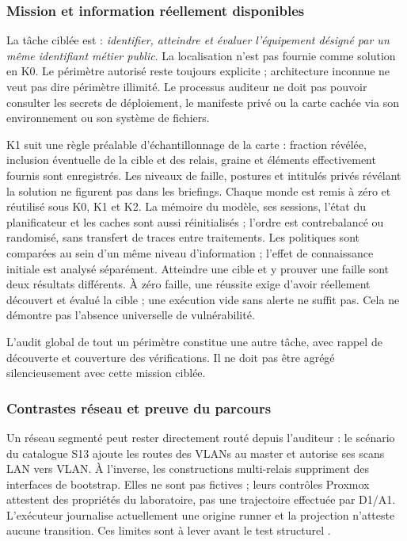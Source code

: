 \documentclass[11pt,a4paper]{article}
\begin{document}
\subsubsection{Mission et information réellement disponibles}
La tâche ciblée est : \emph{identifier, atteindre et évaluer l'équipement désigné par un même identifiant métier public}. La localisation n'est pas fournie comme solution en K0. Le périmètre autorisé reste toujours explicite ; architecture inconnue ne veut pas dire périmètre illimité. Le processus auditeur ne doit pas pouvoir consulter les secrets de déploiement, le manifeste privé ou la carte cachée via son environnement ou son système de fichiers.

K1 suit une règle préalable d'échantillonnage de la carte : fraction révélée, inclusion éventuelle de la cible et des relais, graine et éléments effectivement fournis sont enregistrés. Les niveaux de faille, postures et intitulés privés révélant la solution ne figurent pas dans les briefings. Chaque monde est remis à zéro et réutilisé sous K0, K1 et K2. La mémoire du modèle, ses sessions, l'état du planificateur et les caches sont aussi réinitialisés ; l'ordre est contrebalancé ou randomisé, sans transfert de traces entre traitements. Les politiques sont comparées au sein d'un même niveau d'information ; l'effet de connaissance initiale est analysé séparément. Atteindre une cible et y prouver une faille sont deux résultats différents. À zéro faille, une réussite exige d'avoir réellement découvert et évalué la cible ; une exécution vide sans alerte ne suffit pas. Cela ne démontre pas l'absence universelle de vulnérabilité.

L'audit global de tout un périmètre constitue une autre tâche, avec rappel de découverte et couverture des vérifications. Il ne doit pas être agrégé silencieusement avec cette mission ciblée.

\subsubsection{Contrastes réseau et preuve du parcours}
Un réseau segmenté peut rester directement routé depuis l'auditeur : le scénario du catalogue S13 ajoute les routes des VLANs au master et autorise ses scans LAN vers VLAN. À l'inverse, les constructions multi-relais suppriment des interfaces de bootstrap. Elles ne sont pas fictives ; leurs contrôles Proxmox attestent des propriétés du laboratoire, pas une trajectoire effectuée par D1/A1. L'exécuteur journalise actuellement une origine runner et la projection n'atteste aucune transition. Ces limites sont à lever avant le test structurel \cite{networkcode}.
\end{document}
